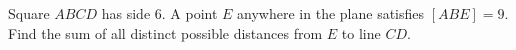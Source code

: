 Square $ABCD$ has side $6$. A point $E$ anywhere in the plane satisfies $[ABE]=9$. Find the sum of all distinct possible distances from $E$ to line $CD$.

